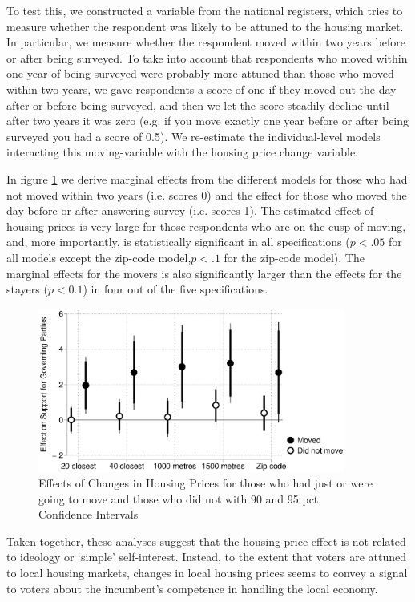 \documentclass[12pt,a4paper]{article}
\begin{document}
To test this, we constructed a variable from the national registers, which tries to measure whether the respondent was likely to be attuned to the housing market. In particular, we measure whether the respondent moved within two years before or after being surveyed. To take into account that respondents who moved within one year of being surveyed were probably more attuned than those who moved within two years, we gave respondents a score of one if they moved out the day after or before being surveyed, and then we let the score steadily decline until after two years it was zero (e.g. if you move exactly one year before or after being surveyed you had a score of 0.5). We re-estimate the individual-level models interacting this moving-variable with the housing price change variable.

In figure \ref{move} we derive marginal effects from the different models for those who had not moved within two years (i.e. scores 0) and the effect for those who moved the day before or after answering survey (i.e. scores 1). The estimated effect of housing prices is very large for those respondents who are on the cusp of moving, and, more importantly, is statistically significant in all specifications ($p<.05$ for all models except the zip-code model,$p<.1$ for the zip-code model). The marginal effects for the movers is also significantly larger than the effects for the stayers ($p<0.1$) in four out of the five specifications.

\begin{figure}[htbp!]
	\includegraphics[width=0.9\textwidth]{../figures/moving.eps}
	\centering
	\caption{Effects of Changes in Housing Prices for those who had just or were going to move and those who did not with 90 and 95 pct. Confidence Intervals}\label{move}
\end{figure}

Taken together, these analyses suggest that the housing price effect is not related to ideology or `simple' self-interest. Instead, to the extent that voters are attuned to local housing markets, changes in local housing prices seems to convey a signal to voters about the incumbent's competence in handling the local economy.
\end{document}
